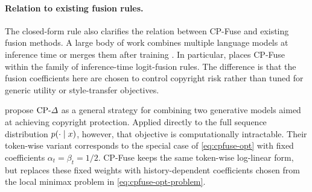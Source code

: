 \begin{algorithm}[t]
  \caption{Summary of CP-Fuse. At each decoding step, the method evaluates the two base models, chooses history-dependent coefficients, forms the protected conditional distribution, and updates the prefix likelihoods.}
  \label{alg:cpfuse-algorithm}
  \centering
\end{algorithm}

\paragraph{Relation to existing fusion rules.}
The closed-form rule also clarifies the relation between CP-Fuse and existing fusion methods. A large body of work combines multiple language models at inference time \citep{liu2021dexperts,jiang2023llm,gururangan2023scaling,hsu2024let,mavromatis2024pack} or merges them after training \citep{wortsman2022model,jin2022dataless,yadav2024ties}. In particular,  places CP-Fuse within the family of inference-time logit-fusion rules. The difference is that the fusion coefficients here are chosen to control copyright risk rather than tuned for generic utility or style-transfer objectives.

\citet{vyas2023provable} propose \(\text{CP-}\Delta\) as a general strategy for combining two generative models aimed at achieving copyright protection. Applied directly to the full sequence distribution \(p(\cdot \mid x)\), however, that objective is computationally intractable. Their token-wise variant corresponds to the special case of \eqref{eq:cpfuse-opt} with fixed coefficients \(\alpha_t = \beta_t = 1/2\). CP-Fuse keeps the same token-wise log-linear form, but replaces these fixed weights with history-dependent coefficients chosen from the local minimax problem in \eqref{eq:cpfuse-opt-problem}.

